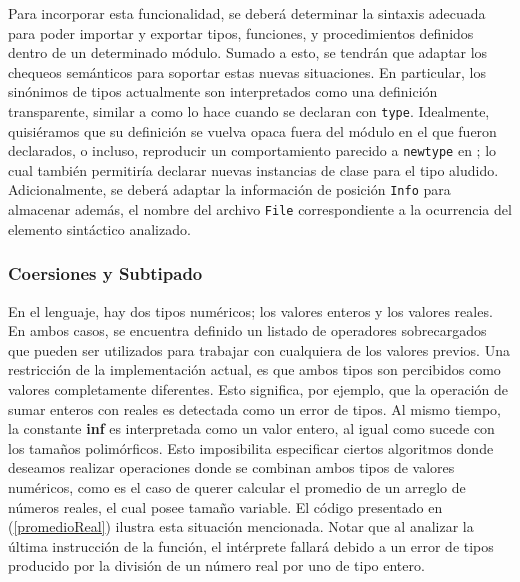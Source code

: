 Para incorporar esta funcionalidad, se deberá determinar la sintaxis adecuada para poder importar y exportar tipos, funciones, y procedimientos definidos dentro de un determinado módulo.
Sumado a esto, se tendrán que adaptar los chequeos semánticos para soportar estas nuevas situaciones.
En particular, los sinónimos de tipos actualmente son interpretados como una definición transparente, similar a como lo hace \Haskell{} cuando se declaran con \lstinline[style = haskell]{type}.
Idealmente, quisiéramos que su definición se vuelva opaca fuera del módulo en el que fueron declarados, o incluso, reproducir un comportamiento parecido a \lstinline[style = haskell]{newtype} en \Haskell{}; lo cual también permitiría declarar nuevas instancias de clase para el tipo aludido.
Adicionalmente, se deberá adaptar la información de posición \lstinline[style = haskell]{Info} para almacenar además, el nombre del archivo \lstinline[style = haskell]{File} correspondiente a la ocurrencia del elemento sintáctico analizado.

\subsubsection{Coersiones y Subtipado}

En el lenguaje, hay dos tipos numéricos; los valores enteros y los valores reales.
En ambos casos, se encuentra definido un listado de operadores sobrecargados que pueden ser utilizados para trabajar con cualquiera de los valores previos.
Una restricción de la implementación actual, es que ambos tipos son percibidos como valores completamente diferentes.
Esto significa, por ejemplo, que la operación de sumar enteros con reales es detectada como un error de tipos.
Al mismo tiempo, la constante \textbf{inf} es interpretada como un valor entero, al igual como sucede con los tamaños polimórficos.
Esto imposibilita especificar ciertos algoritmos donde deseamos realizar operaciones donde se combinan ambos tipos de valores numéricos, como es el caso de querer calcular el promedio de un arreglo de números reales, el cual posee tamaño variable.
El código presentado en (\ref{promedioReal}) ilustra esta situación mencionada.
Notar que al analizar la última instrucción de la función, el intérprete fallará debido a un error de tipos producido por la división de un número real por uno de tipo entero.

